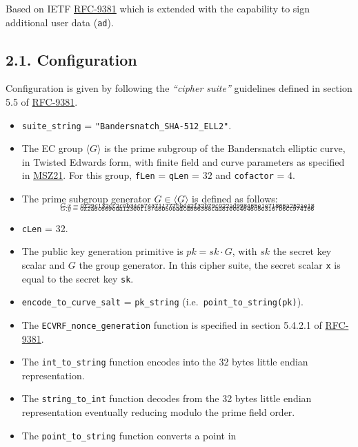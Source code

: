 \documentclass[
]{article}
\begin{document}
Based on IETF \href{https://datatracker.ietf.org/doc/rfc9381}{RFC-9381}
which is extended with the capability to sign additional user data
(\texttt{ad}).

\hypertarget{configuration}{%
\subsection{2.1. Configuration}\label{configuration}}

Configuration is given by following the \emph{``cipher suite''}
guidelines defined in section 5.5 of
\href{https://datatracker.ietf.org/doc/rfc9381}{RFC-9381}.

\begin{itemize}
\item
  \texttt{suite\_string} = \texttt{"Bandersnatch\_SHA-512\_ELL2"}.
\item
  The EC group \(\langle G \rangle\) is the prime subgroup of the
  Bandersnatch elliptic curve, in Twisted Edwards form, with finite
  field and curve parameters as specified in
  \href{https://eprint.iacr.org/2021/1152}{MSZ21}. For this group,
  \texttt{fLen} = \texttt{qLen} = \(32\) and \texttt{cofactor} = \(4\).
\item
  The prime subgroup generator \(G \in \langle G \rangle\) is defined as
  follows:
  \[_{G.x = \texttt{0x29c132cc2c0b34c5743711777bbe42f32b79c022ad998465e1e71866a252ae18}}\]
  \[_{G.y = \texttt{0x2a6c669eda123e0f157d8b50badcd586358cad81eee464605e3167b6cc974166}}\]
\item
  \texttt{cLen} = 32.
\item
  The public key generation primitive is \(pk = sk \cdot G\), with
  \(sk\) the secret key scalar and \(G\) the group generator. In this
  cipher suite, the secret scalar \texttt{x} is equal to the secret key
  \texttt{sk}.
\item
  \texttt{encode\_to\_curve\_salt} = \texttt{pk\_string}
  (i.e.~\texttt{point\_to\_string(pk)}).
\item
  The \texttt{ECVRF\_nonce\_generation} function is specified in section
  5.4.2.1 of \href{https://datatracker.ietf.org/doc/rfc9381}{RFC-9381}.
\item
  The \texttt{int\_to\_string} function encodes into the 32 bytes little
  endian representation.
\item
  The \texttt{string\_to\_int} function decodes from the 32 bytes little
  endian representation eventually reducing modulo the prime field
  order.
\item
  The \texttt{point\_to\_string} function converts a point in

\end{itemize}
\end{document}
